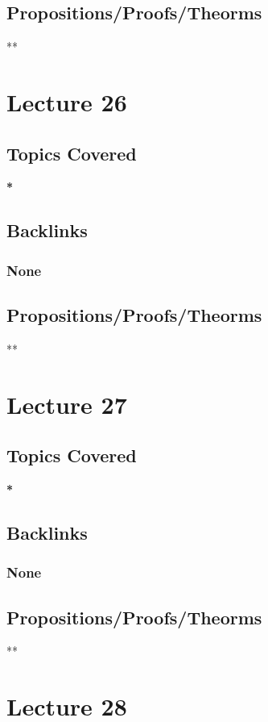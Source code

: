 \documentclass[11pt]{article}
\begin{document}
\subsection*{Propositions/Proofs/Theorms}
\label{sec:org7f0747a}
**

\section*{Lecture 26}
\label{sec:org68c5178}
\subsection*{Topics Covered}
\label{sec:org1a5cd22}
\textbf{*}
\subsection*{Backlinks}
\label{sec:org7d69fe5}
\subsubsection*{None}
\label{sec:org2f59498}
\subsection*{Propositions/Proofs/Theorms}
\label{sec:org4194692}
**

\section*{Lecture 27}
\label{sec:orgacd1f63}
\subsection*{Topics Covered}
\label{sec:org65ff7d1}
\textbf{*}
\subsection*{Backlinks}
\label{sec:orgb29d669}
\subsubsection*{None}
\label{sec:org2b48202}
\subsection*{Propositions/Proofs/Theorms}
\label{sec:orgb217bfb}
**

\section*{Lecture 28}
\label{sec:org5aca37d}
\end{document}
